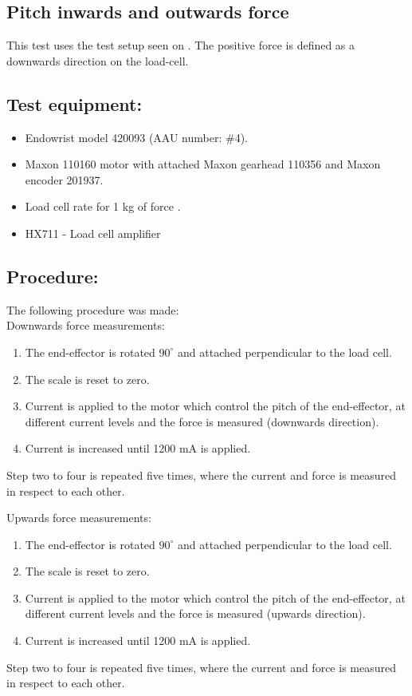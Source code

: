 \subsection{Pitch inwards and outwards force} %
This test uses the test setup seen on . The positive force is defined as a downwards direction on the load-cell.


\subsection*{Test equipment:}
\begin{itemize}
\item Endowrist model 420093 (AAU number: \#4).
\item Maxon 110160 motor with attached Maxon gearhead 110356 and Maxon encoder 201937.
\item Load cell rate for 1 kg of force \cite{Load_cell_1kg}.
\item HX711 - Load cell amplifier \cite{HX711}
\end{itemize}

\subsection*{Procedure:}
The following procedure was made:\\
Downwards force measurements:
\begin{enumerate}
\item The end-effector is rotated $90^\circ$ and attached perpendicular to the load cell. 
\item The scale is reset to zero.
\item Current is applied to the motor which control the pitch of the end-effector, at different current levels and the force is measured (downwards direction).
\item Current is increased until 1200 mA is applied.
\end{enumerate}
Step two to four is repeated five times, where the current and force is measured in respect to each other. 

Upwards force measurements:
\begin{enumerate}
\item The end-effector is rotated $90^\circ$ and attached perpendicular to the load cell. 
\item The scale is reset to zero.
\item Current is applied to the motor which control the pitch of the end-effector, at different current levels and the force is measured (upwards direction).
\item Current is increased until 1200 mA is applied.
\end{enumerate}
Step two to four is repeated five times, where the current and force is measured in respect to each other. 

